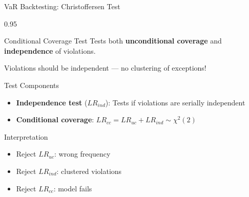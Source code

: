 \documentclass[9pt, aspectratio=169, t]{beamer}
\begin{document}
\begin{frame}{VaR Backtesting: Christoffersen Test}
    \begin{cminipage}{0.95\textwidth}
    \vspace{-0.3cm}
    \begin{block}{Conditional Coverage Test}
        Tests both \textbf{unconditional coverage} and \textbf{independence} of violations.

        Violations should be independent --- no clustering of exceptions!
    \end{block}
    \vspace{-0.1cm}
    \begin{block}{Test Components}
        \begin{itemize}\setlength{\itemsep}{0pt}
            \item \textbf{Independence test} ($LR_{ind}$): Tests if violations are serially independent
            \item \textbf{Conditional coverage}: $LR_{cc} = LR_{uc} + LR_{ind} \sim \chi^2(2)$
        \end{itemize}
    \end{block}
    \vspace{-0.1cm}
    \begin{alertblock}{Interpretation}
        \begin{itemize}\setlength{\itemsep}{0pt}
            \item Reject $LR_{uc}$: wrong frequency
            \item Reject $LR_{ind}$: clustered violations
            \item Reject $LR_{cc}$: model fails
        \end{itemize}
    \end{alertblock}
    \end{cminipage}
\end{frame}
\end{document}
